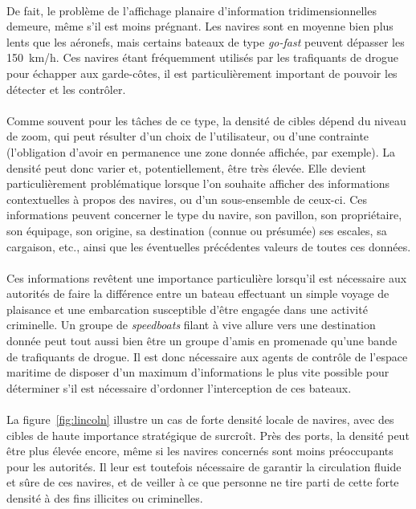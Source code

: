 	\paragraph{}
	De fait, le problème de l'affichage planaire d'information tridimensionnelles demeure, même s'il est moins prégnant. Les navires sont en moyenne bien plus lents que les aéronefs, mais certains bateaux de type \emph{go-fast} peuvent dépasser les 150~km/h. Ces navires étant fréquemment utilisés par les trafiquants de drogue pour échapper aux garde-côtes, il est particulièrement important de pouvoir les détecter et les contrôler.
	
	\paragraph{}
	Comme souvent pour les tâches de ce type, la densité de cibles dépend du niveau de zoom, qui peut résulter d'un choix de l'utilisateur, ou d'une contrainte (l'obligation d'avoir en permanence une zone donnée affichée, par exemple). La densité peut donc varier et, potentiellement, être très élevée. Elle devient particulièrement problématique lorsque l'on souhaite afficher des informations contextuelles à propos des navires, ou d'un sous-ensemble de ceux-ci. Ces informations peuvent concerner le type du navire, son pavillon, son propriétaire, son équipage, son origine, sa destination (connue ou présumée) ses escales, sa cargaison, etc., ainsi que les éventuelles précédentes valeurs de toutes ces données.
	
	\paragraph{}
	Ces informations revêtent une importance particulière lorsqu'il est nécessaire aux autorités de faire la différence entre un bateau effectuant un simple voyage de plaisance et une embarcation susceptible d'être engagée dans une activité criminelle. Un groupe de \emph{speedboats} filant à vive allure vers une destination donnée peut tout aussi bien être un groupe d'amis en promenade qu'une bande de trafiquants de drogue. Il est donc nécessaire aux agents de contrôle de l'espace maritime de disposer d'un maximum d'informations le plus vite possible pour déterminer s'il est nécessaire d'ordonner l'interception de ces bateaux.
	
	\paragraph{}
	La figure~\ref{fig:lincoln} illustre un cas de forte densité locale de navires, avec des cibles de haute importance stratégique de surcroît. Près des ports, la densité peut être plus élevée encore, même si les navires concernés sont moins préoccupants pour les autorités. Il leur est toutefois nécessaire de garantir la circulation fluide et sûre de ces navires, et de veiller à ce que personne ne tire parti de cette forte densité à des fins illicites ou criminelles.
	
